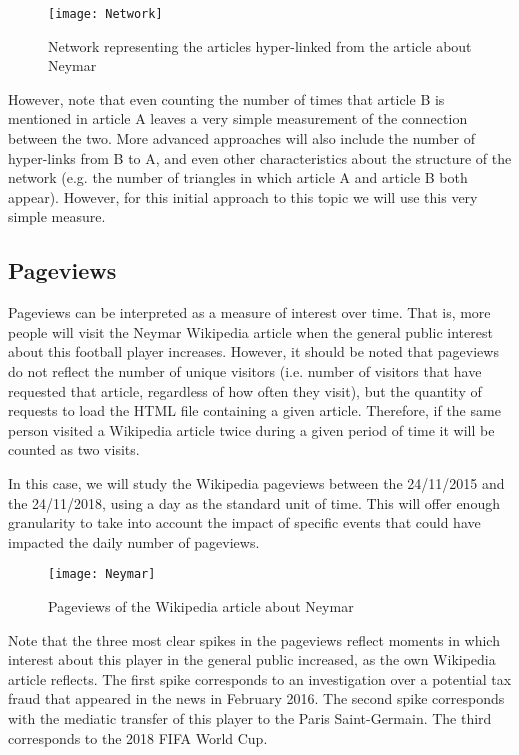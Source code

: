 \documentclass[11pt]{article}
\begin{document}
\begin{figure}[h]
	\centering
	\texttt{[image: Network]}
	\caption{Network representing the articles hyper-linked from the article about Neymar}
\end{figure}

However, note that even counting the number of times that article B is mentioned in article A leaves a very simple measurement of the connection between the two. More advanced approaches will also include the number of hyper-links from B to A, and even other characteristics about the structure of the network (e.g. the number of triangles in which article A and article B both appear). However, for this initial approach to this topic we will use this very simple measure.

\subsection{Pageviews}

Pageviews can be interpreted as a measure of interest over time. That is, more people will visit the Neymar Wikipedia article when the general public interest about this football player increases. However, it should be noted that pageviews do not reflect the number of unique visitors (i.e. number of visitors that have requested that article, regardless of how often they visit), but the quantity of requests to load the HTML file containing a given article. Therefore, if the same person visited a Wikipedia article twice during a given period of time it will be counted as two visits.

In this case, we will study the Wikipedia pageviews between the 24/11/2015 and the 24/11/2018, using a day as the standard unit of time. This will offer enough granularity to take into account the impact of specific events that could have impacted the daily number of pageviews.

\begin{figure}[h]
	\centering
	\texttt{[image: Neymar]}
	\caption{Pageviews of the Wikipedia article about Neymar}
\end{figure}


Note that the three most clear spikes in the pageviews reflect moments in which interest about this player in the general public increased, as the own Wikipedia article reflects.  The first spike corresponds to an investigation over a potential tax fraud that appeared in the news in February 2016. The second spike corresponds with the mediatic transfer of this player to the Paris Saint-Germain. The third corresponds to the 2018 FIFA World Cup.
\end{document}
